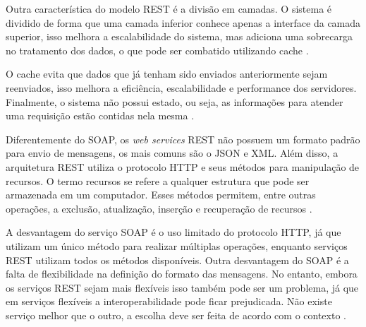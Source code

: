 Outra característica do modelo REST é a divisão em camadas. O sistema é dividido de forma que 
uma camada inferior conhece apenas a interface da camada superior, isso melhora a 
escalabilidade do sistema, mas adiciona uma sobrecarga no tratamento dos dados, o que pode 
ser combatido utilizando cache \cite{fielding2000architectural}. 

O cache evita que dados que já tenham sido enviados anteriormente sejam reenviados, isso 
melhora a eficiência, escalabilidade e performance dos servidores. Finalmente, o sistema 
não possui estado, ou seja, as informações para atender uma requisição estão contidas nela 
mesma \cite{fielding2000architectural}.

Diferentemente do SOAP, os \textit{web services} REST não possuem um formato padrão para envio 
de mensagens, os mais comuns são o JSON e XML. Além disso, a arquitetura REST utiliza o 
protocolo HTTP e seus métodos para manipulação de recursos. O termo recursos se refere a 
qualquer estrutura que pode ser armazenada em um computador. Esses métodos permitem, entre 
outras operações, a exclusão, atualização, inserção e recuperação de recursos \cite{lima2012}.

A desvantagem do serviço SOAP é o uso limitado do protocolo HTTP, já que utilizam um único 
método para realizar múltiplas operações, enquanto serviços REST utilizam todos os métodos 
disponíveis. Outra desvantagem do SOAP é a falta de flexibilidade na definição do formato 
das mensagens. No entanto, embora os serviços REST sejam mais flexíveis isso também pode ser 
um problema, já que em serviços flexíveis a interoperabilidade pode ficar prejudicada. Não 
existe serviço melhor que o outro, a escolha deve ser feita de acordo com o contexto 
\cite{lima2012}.